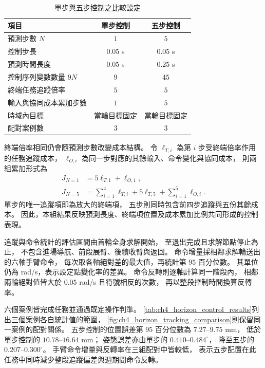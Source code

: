 \begin{table}[htbp]
    \centering
    \caption{單步與五步控制之比較設定}
    \label{tab:ch4_horizon_control_settings}
    \begingroup
    \small
    \renewcommand{\arraystretch}{1.2}
    \begin{tabular}{p{} c c}
        \hline
        項目 & 單步控制 & 五步控制 \\
        \hline
        預測步數 $N$ & $1$ & $5$ \\
        控制步長 & $0.05$ s & $0.05$ s \\
        預測時間長度 & $0.05$ s & $0.25$ s \\
        控制序列變數數量 $9N$ & $9$ & $45$ \\
        終端任務追蹤倍率 & $5$ & $5$ \\
        輸入與協同成本累加步數 & $1$ & $5$ \\
        時域內目標 & 當輪目標固定 & 當輪目標固定 \\
        配對案例數 & $3$ & $3$ \\
        \hline
    \end{tabular}
    \endgroup
\end{table}

終端倍率相同仍會隨預測步數改變成本結構。
令 $\ell_{T,i}$ 為第 $i$ 步受終端倍率作用的任務追蹤成本，
$\ell_{O,i}$ 為同一步對應的其餘輸入、命令變化與協同成本，
則兩組累加形式為
\begin{equation}
    \begin{aligned}
        J_{N=1}&=5\ell_{T,1}+\ell_{O,1},\\
        J_{N=5}&=\sum_{i=1}^{4}\ell_{T,i}
                   +5\ell_{T,5}+\sum_{i=1}^{5}\ell_{O,i}.
    \end{aligned}
    \label{eq:ch4_horizon_cost_accumulation}
\end{equation}
單步的唯一追蹤項即為放大的終端項，
五步則同時包含前四步追蹤與五份其餘成本。
因此，本組結果反映預測長度、終端項位置及成本累加比例共同形成的控制表現。

追蹤與命令統計的評估區間由首輪全身求解開始，
至退出完成且求解節點停止為止，
不包含進場導航、前段展臂、後續收臂與返回。
命令增量採相鄰求解輪送出的六軸手臂命令，
每次取各軸絕對差的最大值，再統計第 $95$ 百分位數。
其單位仍為 rad/s，表示設定點變化率的差異。
命令反轉則逐軸計算同一階段內，
相鄰兩輪絕對值皆大於 $0.05$ rad/s 且符號相反的次數，
再以整段控制時間換算反轉率。

六個案例皆完成任務並通過既定操作判準。
\cref{tab:ch4_horizon_control_results}列出三個案例各自統計值的範圍，
\cref{fig:ch4_horizon_tracking_comparison}則保留同一案例的配對關係。
五步控制的位置誤差第 $95$ 百分位數為 $7.27$--$9.75$ mm，
低於單步控制的 $10.78$--$16.64$ mm；
姿態誤差亦由單步的 $0.410$--$0.484^\circ$，
降至五步的 $0.207$--$0.300^\circ$。
手臂命令增量與反轉率在三組配對中皆較低，
表示五步配置在此任務中同時減少整段追蹤偏差與週期間命令反轉。

